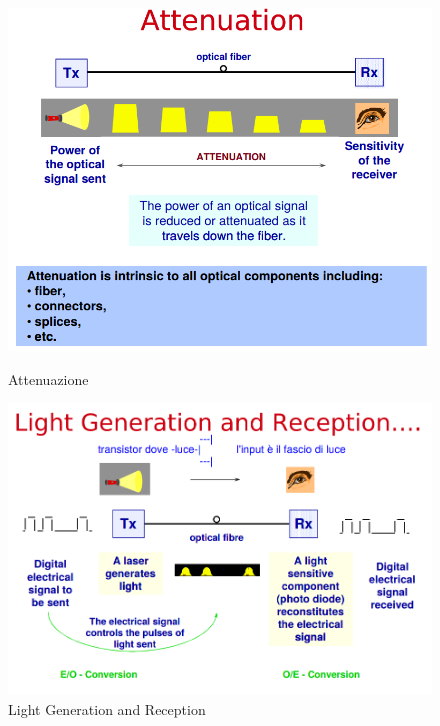 \documentclass[8pt]{extarticle}
\begin{document}
\begin{figure}[H]
    \centering
    \begin{minipage}[c]{\linewidth}
        \begin{minipage}[l]{0.48\linewidth}
            \includegraphics[width=\linewidth]{images/FO1.png}
		    \caption{Attenuazione}\label{fig:1}
        \end{minipage}
        \hspace{0.04\linewidth}
        \begin{minipage}[l]{0.48\linewidth}
            \includegraphics[width=\linewidth]{images/FO2.png}
           	\caption{Light Generation and Reception}\label{fig:1}
        \end{minipage}
    \end{minipage}
\end{figure}
\end{document}
